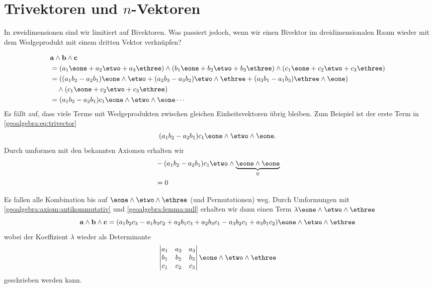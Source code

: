 \section{Trivektoren und $n$-Vektoren}
In zweidimensionen sind wir limitiert auf Bivektoren. Was passiert jedoch, wenn wir einen Bivektor
im dreidimensionalen Raum wieder mit dem Wedgeprodukt mit einem dritten Vektor verknüpfen?

{
\renewcommand{\a}{\mathbf{a}}
\renewcommand{\b}{\mathbf{b}}
\renewcommand{\c}{\mathbf{c}}
\begin{equation} 
\begin{aligned}
&\a \wedge \b \wedge \c \\ 
&= (a_1 \eone + a_2 \etwo + a_3 \ethree) \wedge (b_1 \eone + b_2 \etwo + b_3 \ethree) \wedge (c_1 \eone + c_2 \etwo + c_3 \ethree) \\
&= ((a_1 b_2 - a_2 b_1) \eone \wedge \etwo +(a_2 b_3 - a_3 b_2) \etwo \wedge \ethree +(a_3 b_1 - a_1 b_3) \ethree \wedge \eone) \\
&\quad\wedge (c_1 \eone + c_2 \etwo + c_3 \ethree) \\
&= (a_1 b_2 - a_2 b_1) c_1 \eone \wedge \etwo \wedge \eone \cdots
\end{aligned}
\label{geoalgebra:eq:trivector}
\end{equation}
Es fällt auf, dass viele Terme mit Wedgeprodukten zwischen gleichen Einheitsvektoren übrig bleiben. Zum Beispiel ist der erste Term in \eqref{geoalgebra:eq:trivector}
\begin{equation}
(a_1 b_2 - a_2 b_1) c_1 \eone \wedge \etwo \wedge \eone.
\end{equation}
Durch umformen mit den bekannten Axiomen erhalten wir
\begin{equation}
\begin{aligned}
&-(a_1 b_2 - a_2 b_1) c_1 \etwo \wedge \underbrace{\eone \wedge \eone}_{0} \\
&=0
\end{aligned}
\end{equation}

Es fallen alle Kombination bis auf $\eone \wedge \etwo \wedge \ethree$ (und Permutationen) weg.
Durch Umformungen mit \eqref{geoalgebra:axiom:antikommutativ} und
\eqref{geoalgebra:lemma:null} erhalten wir dann einen Term $\lambda \eone \wedge \etwo \wedge \ethree$
\begin{equation}
\a \wedge \b \wedge \c = (a_1 b_2 c_3 - a_1 b_3 c_2 + a_2 b_1 c_3 + a_2 b_3 c_1 - a_3 b_2 c_1 + a_3 b_1 c_2) \eone \wedge \etwo \wedge \ethree
\end{equation}
wobei der Koeffizient $\lambda$ wieder als Determinante
\begin{equation}
\begin{vmatrix} a_1 & a_2 & a_3 \\ b_1 & b_2 & b_3 \\ c_1 & c_2 & c_3 \end{vmatrix} \eone \wedge \etwo \wedge \ethree
\end{equation}
geschrieben werden kann.

}

